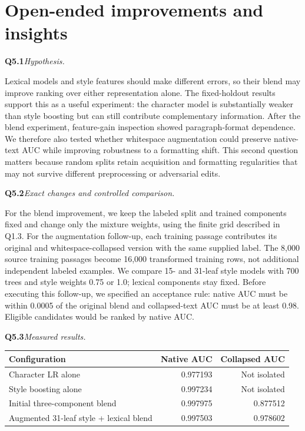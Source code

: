 \documentclass[10pt,letterpaper]{article}
\newcommand{\q}[2]{\needspace{4\baselineskip}\par\addvspace{7pt}\textbf{#1}\quad\textit{#2}\par\nobreak}
\begin{document}
\section{Open-ended improvements and insights}
\q{Q5.1}{Hypothesis.}
Lexical models and style features should make different errors, so their blend may improve ranking over either representation alone.
The fixed-holdout results support this as a useful experiment: the character model is substantially weaker than style boosting but can still contribute complementary information.
After the blend experiment, feature-gain inspection showed paragraph-format dependence. We therefore also tested whether whitespace augmentation could preserve native-text AUC while improving robustness to a formatting shift.
This second question matters because random splits retain acquisition and formatting regularities that may not survive different preprocessing or adversarial edits.
\q{Q5.2}{Exact changes and controlled comparison.}
For the blend improvement, we keep the labeled split and trained components fixed and change only the mixture weights, using the finite grid described in Q1.3.
For the augmentation follow-up, each training passage contributes its original and whitespace-collapsed version with the same supplied label.
The 8,000 source training passages become 16,000 transformed training rows, not additional independent labeled examples.
We compare 15- and 31-leaf style models with 700 trees and style weights 0.75 or 1.0; lexical components stay fixed.
Before executing this follow-up, we specified an acceptance rule: native AUC must be within 0.0005 of the original blend and collapsed-text AUC must be at least 0.98. Eligible candidates would be ranked by native AUC.
\q{Q5.3}{Measured results.}
\begin{tabularx}{\linewidth}{@{}Yrr@{}}
\toprule
Configuration & Native AUC & Collapsed AUC \\ \midrule
Character LR alone & 0.977193 & Not isolated \\
Style boosting alone & 0.997234 & Not isolated \\
Initial three-component blend & 0.997975 & 0.877512 \\
Augmented 31-leaf style + lexical blend & 0.997503 & 0.978602 \\
\bottomrule
\end{tabularx}
\end{document}
